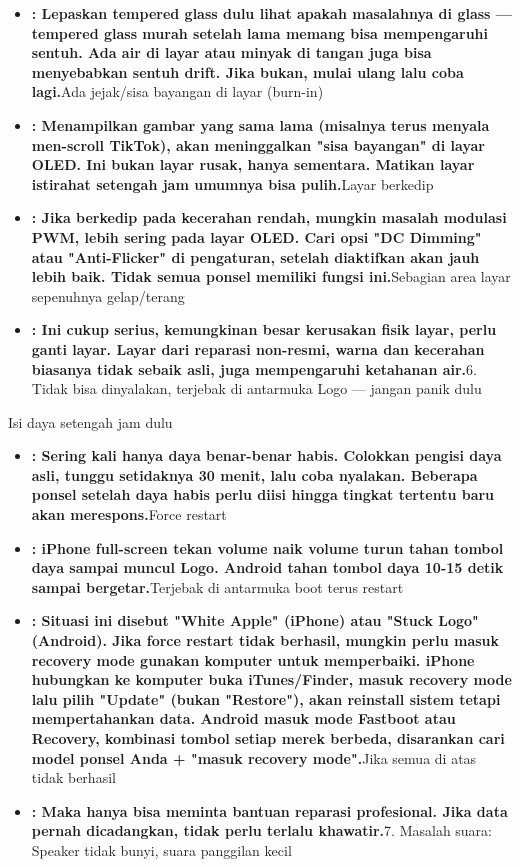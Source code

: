 
\begin{itemize}
  \item \textbf{: Lepaskan tempered glass dulu lihat apakah masalahnya di glass — tempered glass murah setelah lama memang bisa mempengaruhi sentuh. Ada air di layar atau minyak di tangan juga bisa menyebabkan sentuh drift. Jika bukan, mulai ulang lalu coba lagi.}Ada jejak/sisa bayangan di layar (burn-in)
  \item \textbf{: Menampilkan gambar yang sama lama (misalnya terus menyala men-scroll TikTok), akan meninggalkan "sisa bayangan" di layar OLED. Ini bukan layar rusak, hanya sementara. Matikan layar istirahat setengah jam umumnya bisa pulih.}Layar berkedip
  \item \textbf{: Jika berkedip pada kecerahan rendah, mungkin masalah modulasi PWM, lebih sering pada layar OLED. Cari opsi "DC Dimming" atau "Anti-Flicker" di pengaturan, setelah diaktifkan akan jauh lebih baik. Tidak semua ponsel memiliki fungsi ini.}Sebagian area layar sepenuhnya gelap/terang
  \item \textbf{: Ini cukup serius, kemungkinan besar kerusakan fisik layar, perlu ganti layar. Layar dari reparasi non-resmi, warna dan kecerahan biasanya tidak sebaik asli, juga mempengaruhi ketahanan air.}6. Tidak bisa dinyalakan, terjebak di antarmuka Logo — jangan panik dulu
\end{itemize}


Isi daya setengah jam dulu

\begin{itemize}
  \item \textbf{: Sering kali hanya daya benar-benar habis. Colokkan pengisi daya asli, tunggu setidaknya 30 menit, lalu coba nyalakan. Beberapa ponsel setelah daya habis perlu diisi hingga tingkat tertentu baru akan merespons.}Force restart
  \item \textbf{: iPhone full-screen tekan volume naik volume turun tahan tombol daya sampai muncul Logo. Android tahan tombol daya 10-15 detik sampai bergetar.}Terjebak di antarmuka boot terus restart
  \item \textbf{: Situasi ini disebut "White Apple" (iPhone) atau "Stuck Logo" (Android). Jika force restart tidak berhasil, mungkin perlu masuk recovery mode gunakan komputer untuk memperbaiki. iPhone hubungkan ke komputer buka iTunes/Finder, masuk recovery mode lalu pilih "Update" (bukan "Restore"), akan reinstall sistem tetapi mempertahankan data. Android masuk mode Fastboot atau Recovery, kombinasi tombol setiap merek berbeda, disarankan cari model ponsel Anda + "masuk recovery mode".}Jika semua di atas tidak berhasil
  \item \textbf{: Maka hanya bisa meminta bantuan reparasi profesional. Jika data pernah dicadangkan, tidak perlu terlalu khawatir.}7. Masalah suara: Speaker tidak bunyi, suara panggilan kecil
\end{itemize}

